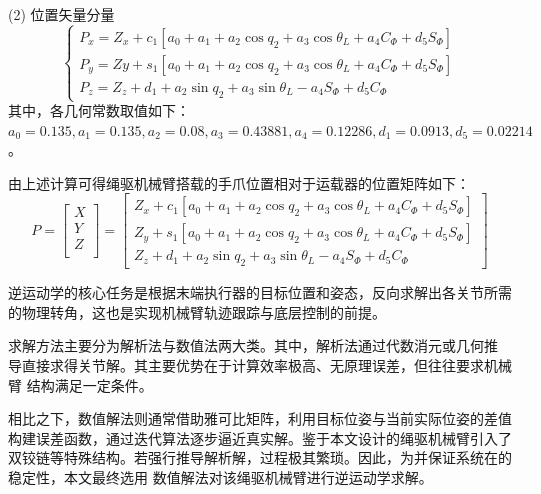     (2) 位置矢量分量
    \begin{equation}
        \left\{\begin{array}{c}
        P_x = Z_x + c_1 \left[ a_0 + a_1 + a_2 \cos q_2 + a_3 \cos \theta_L + a_4 C_{\Phi} + d_5 S_{\Phi} \right] \\
        P_y = Zy + s_1 \left[ a_0 + a_1 + a_2 \cos q_2 + a_3 \cos \theta_L + a_4 C_{\Phi} + d_5 S_{\Phi} \right] \\
        P_z = Z_z + d_1 + a_2 \sin q_2 + a_3 \sin \theta_L - a_4 S_{\Phi} + d_5 C_{\Phi}
        \end{array}\right.
    \end{equation}
    其中，各几何常数取值如下：$a_0=0.135, a_1=0.135, a_2=0.08, a_3=0.43881, a_4=0.12286, d_1=0.0913, d_5=0.02214$。
    
    由上述计算可得绳驱机械臂搭载的手爪位置相对于运载器的位置矩阵如下：
    \begin{equation}
        P = \begin{bmatrix}
            X \\
            Y \\
            Z \\
        \end{bmatrix}=  \begin{bmatrix}
                        Z_x + c_1 \left[ a_0 + a_1 + a_2 \cos q_2 + a_3 \cos \theta_L + a_4 C_{\Phi} + d_5 S_{\Phi} \right] \\
                        Z_y + s_1 \left[ a_0 + a_1 + a_2 \cos q_2 + a_3 \cos \theta_L + a_4 C_{\Phi} + d_5 S_{\Phi} \right] \\
                        Z_z + d_1 + a_2 \sin q_2 + a_3 \sin \theta_L - a_4 S_{\Phi} + d_5 C_{\Phi}
                        \end{bmatrix}
        \end{equation}

    逆运动学的核心任务是根据末端执行器的目标位置和姿态，反向求解出各关节所需的物理转角，这也是实现机械臂轨迹跟踪与底层控制的前提。

    求解方法主要分为解析法与数值法两大类。其中，解析法通过代数消元或几何推
    导直接求得关节解。其主要优势在于计算效率极高、无原理误差，但往往要求机械臂
    结构满足一定条件。
    
    相比之下，数值解法则通常借助雅可比矩阵，利用目标位姿与当前实际位姿的差值
    构建误差函数，通过迭代算法逐步逼近真实解。鉴于本文设计的绳驱机械臂引入了
    双铰链等特殊结构。若强行推导解析解，过程极其繁琐。因此，为并保证系统在的
    稳定性，本文最终选用
    数值解法对该绳驱机械臂进行逆运动学求解。
